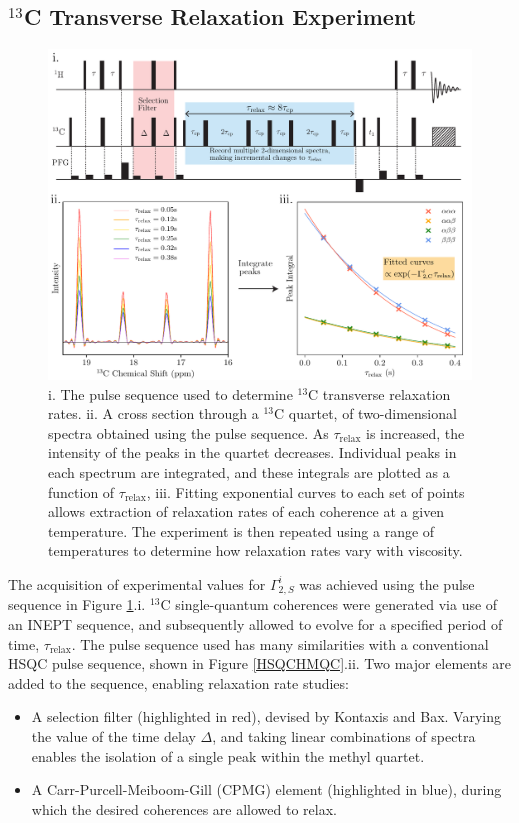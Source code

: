 \subsection{$^{13}$C Transverse Relaxation Experiment}
\begin{figure}
\centering
\includegraphics[scale=0.75]{./Figures/SimonsFigs/DecayCurves.pdf}
\caption{i. The pulse sequence used to determine $^{13}$C transverse relaxation rates. ii. A cross section through a $^{13}$C quartet, of two-dimensional spectra obtained using the pulse sequence. As $\tau_{\text{relax}}$ is increased, the intensity of the peaks in the quartet decreases. Individual peaks in each spectrum are integrated, and these integrals are plotted as a function of $\tau_{\text{relax}}$, iii. Fitting exponential curves to each set of points allows extraction of relaxation rates of each coherence at a given temperature. The experiment is then repeated using a range of temperatures to determine how relaxation rates vary with viscosity.}
\label{RelaxDecay}
\end{figure}
The acquisition of experimental values for $\Gamma_{2,S}^i$ was achieved using the pulse sequence in Figure \ref{RelaxDecay}.i. $^{13}$C single-quantum coherences were generated via use of an INEPT sequence\cite{RN54}, and subsequently allowed to evolve for a specified period of time, $\tau_{\text{relax}}$. The pulse sequence used has many similarities with a conventional HSQC pulse sequence, shown in Figure \ref{HSQCHMQC}.ii. Two major elements are added to the sequence, enabling relaxation rate studies:
\begin{itemize}
\item A selection filter (highlighted in red), devised by Kontaxis and Bax\cite{RN3}. Varying the value of the time delay $\Delta$, and taking linear combinations of spectra enables the isolation of a single peak within the methyl quartet.
\item A Carr-Purcell-Meiboom-Gill (CPMG) element\cite{RN47,RN48} (highlighted in blue), during which the desired coherences are allowed to relax.
\end{itemize}

